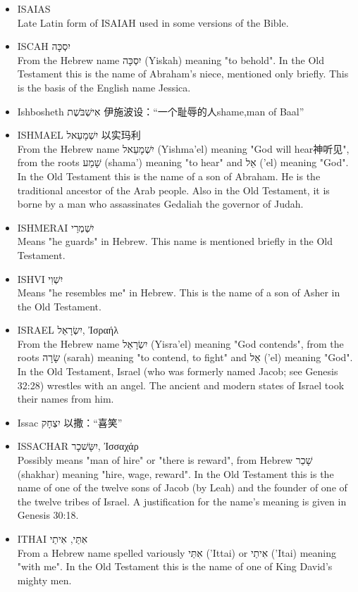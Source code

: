 \begin{itemize}
\item ISAIAS \\
Late Latin form of ISAIAH used in some versions of the Bible.
\item ISCAH יִסְכָּה \\
From the Hebrew name יִסְכָּה (Yiskah) meaning "to behold". In the Old Testament this is the name of Abraham's niece, mentioned only briefly. This is the basis of the English name Jessica.
\item Ishbosheth אִישְׁבֹּשֶׁת‎ 伊施波设：“一个耻辱的人shame,man of Baal”

\item ISHMAEL יִשְׁמָעֵאל 以实玛利\\
From the Hebrew name יִשְׁמָעֵאל (Yishma'el) meaning "God will hear神听见", from the roots שָׁמַע (shama') meaning "to hear" and אֵל ('el) meaning "God". In the Old Testament this is the name of a son of Abraham. He is the traditional ancestor of the Arab people. Also in the Old Testament, it is borne by a man who assassinates Gedaliah the governor of Judah. 
\item ISHMERAI יִשְׁמְרַי \\
Means "he guards" in Hebrew. This name is mentioned briefly in the Old Testament.
\item ISHVI יִשְׁוִי \\
Means "he resembles me" in Hebrew. This is the name of a son of Asher in the Old Testament.
\item ISRAEL יִשְׂרָאֵל, Ἰσραήλ \\
From the Hebrew name יִשְׂרָאֵל (Yisra'el) meaning "God contends", from the roots שָׂרָה (sarah) meaning "to contend, to fight" and אֵל ('el) meaning "God". In the Old Testament, Israel (who was formerly named Jacob; see Genesis 32:28) wrestles with an angel. The ancient and modern states of Israel took their names from him.
\item Issac יִצְחָק‎ 以撒：“喜笑”
\item ISSACHAR יִשָּׂשׁכָר, Ἰσσαχάρ \\
Possibly means "man of hire" or "there is reward", from Hebrew שָׁכַר (shakhar) meaning "hire, wage, reward". In the Old Testament this is the name of one of the twelve sons of Jacob (by Leah) and the founder of one of the twelve tribes of Israel. A justification for the name's meaning is given in Genesis 30:18.
\item ITHAI אִתַּי, אִיתַי \\
From a Hebrew name spelled variously אִתַּי ('Ittai) or אִיתַי ('Itai) meaning "with me". In the Old Testament this is the name of one of King David's mighty men.

\end{itemize}
